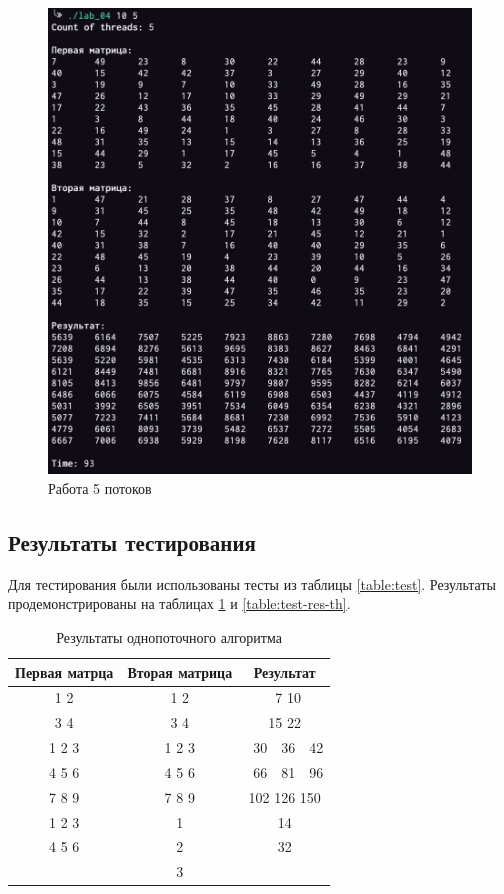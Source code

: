 \documentclass[a4paper,12pt]{article}
\begin{document}
\begin{figure}[H]
    \centering
    \includegraphics[scale=0.6]{ten}
    \caption{Работа 5 потоков}
    \label{img:ten}
\end{figure}

\subsection{Результаты тестирования}

Для тестирования были использованы тесты из таблицы \ref{table:test}.
Результаты продемонстрированы на таблицах \ref{table:test-res} и \ref{table:test-res-th}.

\begin{table}[H]
    \caption{Результаты однопоточного алгоритма}
    \label{table:test-res}
    \centering
    \begin{tabular}{|c|c|c|}
        \hline
        Первая матрца & Вторая матрица & Результат \\
        \hline
        1 2 & 1 2 & \ 7 10 \\
        3 4 & 3 4 & 15 22 \\
        \hline
        1 2 3 & 1 2 3 & \ 30\ \ 36\ \ 42 \\
        4 5 6 & 4 5 6 & \ 66\ \ 81\ \ 96 \\
        7 8 9 & 7 8 9 & 102 126 150 \\
        \hline
        1 2 3 & 1 & 14 \\
        4 5 6 & 2 & 32 \\
              & 3 & \\
        \hline
    \end{tabular}
\end{table}
\end{document}
